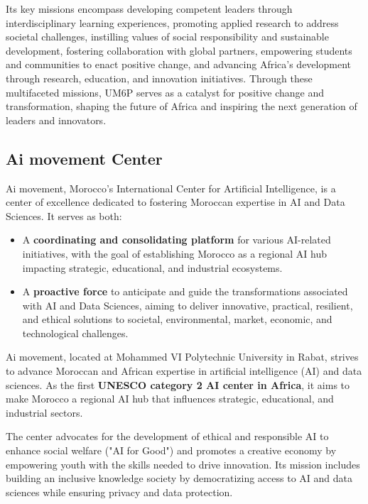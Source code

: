 Its key missions encompass developing competent leaders through interdisciplinary learning experiences, promoting applied research to address societal challenges, instilling values of social responsibility and sustainable development, fostering collaboration with global partners, empowering students and communities to enact positive change, and advancing Africa's development through research, education, and innovation initiatives. Through these multifaceted missions, UM6P serves as a catalyst for positive change and transformation, shaping the future of Africa and inspiring the next generation of leaders and innovators.



\subsection{Ai movement Center}

Ai movement, Morocco's International Center for Artificial Intelligence, is a center of excellence dedicated to fostering Moroccan expertise in AI and Data Sciences. It serves as both:
\begin{itemize}
    \item A \textbf{coordinating and consolidating platform} for various AI-related initiatives, with the goal of establishing Morocco as a regional AI hub impacting strategic, educational, and industrial ecosystems.
    \item A \textbf{proactive force} to anticipate and guide the transformations associated with AI and Data Sciences, aiming to deliver innovative, practical, resilient, and ethical solutions to societal, environmental, market, economic, and technological challenges.

\end{itemize}


Ai movement, located at Mohammed VI Polytechnic University in Rabat, strives to advance Moroccan and African expertise in artificial intelligence (AI) and data sciences. As the first \textbf{UNESCO category 2 AI center in Africa}, it aims to make Morocco a regional AI hub that influences strategic, educational, and industrial sectors.

The center advocates for the development of ethical and responsible AI to enhance social welfare ("AI for Good") and promotes a creative economy by empowering youth with the skills needed to drive innovation. Its mission includes building an inclusive knowledge society by democratizing access to AI and data sciences while ensuring privacy and data protection.

